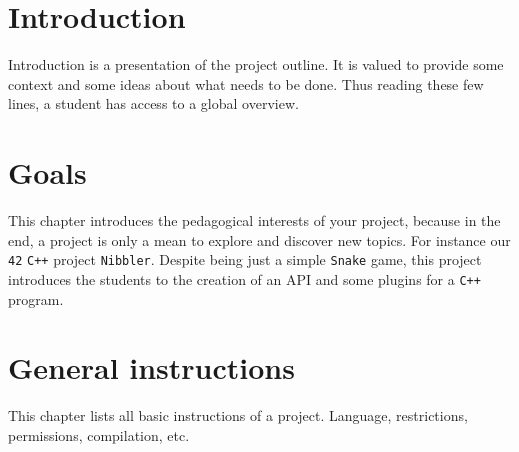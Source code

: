\documentclass{42-en}
\begin{document}
\chapter{Introduction}

    Introduction is a presentation of the project outline. It is valued
    to provide some context and some ideas about what needs to be done.
    Thus reading these few lines, a student has access to a global overview.


\chapter{Goals}

    This chapter introduces the pedagogical interests of your project,
    because in the end, a project is only a mean to explore and
    discover new topics. For instance our \texttt{42} \texttt{C++}
    project \texttt{Nibbler}. Despite being just a simple
    \texttt{Snake} game, this project introduces the students to the
    creation of an API and some plugins for a \texttt{C++} program.


\chapter{General instructions}

    This chapter lists all basic instructions of a project.
    Language, restrictions, permissions, compilation, etc.
\end{document}
